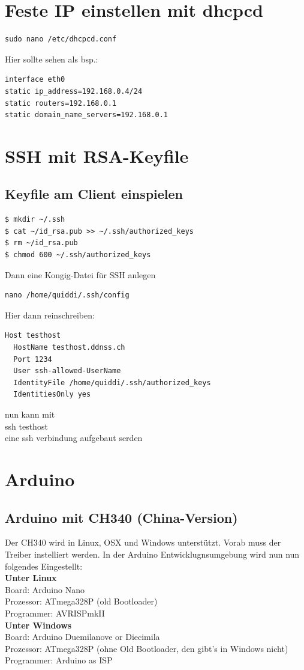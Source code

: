 \documentclass[11pt,fleqn]{book} %
\numberwithin{equation}{section} %
\numberwithin{figure}{section} %
\numberwithin{table}{section} %
\begin{document}
\chapter{Feste IP einstellen mit dhcpcd}
\begin{lstlisting}
sudo nano /etc/dhcpcd.conf
\end{lstlisting}
Hier sollte sehen als bsp.:
\begin{lstlisting}
interface eth0
static ip_address=192.168.0.4/24
static routers=192.168.0.1
static domain_name_servers=192.168.0.1
\end{lstlisting}
\chapter{SSH mit RSA-Keyfile}
\section{Keyfile am Client einspielen}
\begin{lstlisting}
$ mkdir ~/.ssh
$ cat ~/id_rsa.pub >> ~/.ssh/authorized_keys
$ rm ~/id_rsa.pub
$ chmod 600 ~/.ssh/authorized_keys
\end{lstlisting}
Dann eine Kongig-Datei für SSH anlegen
\begin{lstlisting}
nano /home/quiddi/.ssh/config
\end{lstlisting}
Hier dann reinschreiben:
\begin{lstlisting}
Host testhost
  HostName testhost.ddnss.ch
  Port 1234
  User ssh-allowed-UserName
  IdentityFile /home/quiddi/.ssh/authorized_keys
  IdentitiesOnly yes
\end{lstlisting}
nun kann mit\\ 
ssh testhost\\
eine ssh verbindung aufgebaut serden
\chapter{Arduino}
\section{Arduino mit CH340 (China-Version)}
Der CH340 wird in Linux, OSX und Windows unterstützt. Vorab muss der Treiber instelliert werden. In der Arduino Entwicklugnsumgebung wird nun nun folgendes Eingestellt:\\
\textbf{Unter Linux}\\
Board: Arduino Nano\\
Prozessor: ATmega328P (old Bootloader)\\
Programmer: AVRISPmkII\\
\textbf{Unter Windows}\\
Board: Arduino Duemilanove or Diecimila\\
Prozessor: ATmega328P (ohne Old Bootloader, den gibt's in Windows nicht)\\
Programmer: Arduino as ISP\\
\end{document}
